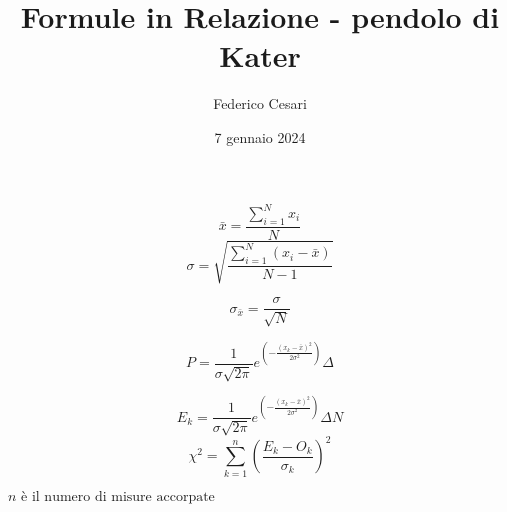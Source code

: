 \documentclass{article}
\title{Formule in Relazione - pendolo di Kater}
\author{Federico Cesari}
\date{7 gennaio 2024}
\begin{document}
\maketitle

\vspace{5cm}

\[
\bar{x} = \frac{\sum_{i=1}^{N}x_{i}}{N}
\]
\[
\sigma = \sqrt{\frac{\sum_{i=1}^{N}\left(x_{i} - \bar{x}\right)}{N-1}}
\]

\[
\sigma_{\bar{x}} = \frac{\sigma}{\sqrt{N}}
\]

\[
P=\frac{1}{\sigma\sqrt{2\pi}}e^{\left(-\frac{\left(x_{k}-\bar{x}\right)^2}{2\sigma^2}\right)}\Delta
\]

\[
E_{k} = \frac{1}{\sigma\sqrt{2\pi}}e^{\left(-\frac{\left(x_{k}-\bar{x}\right)^2}{2\sigma^2}\right)}\Delta N
\]
\vspace{0.4cm}
\[
\chi^2 = \sum_{k=1}^{n}\left(\frac{E_{k}-O_{k}}{\sigma_k}\right)^2
\]
\begin{center}
$n \text{ è il numero di misure accorpate}$
\end{center}
\end{document}
